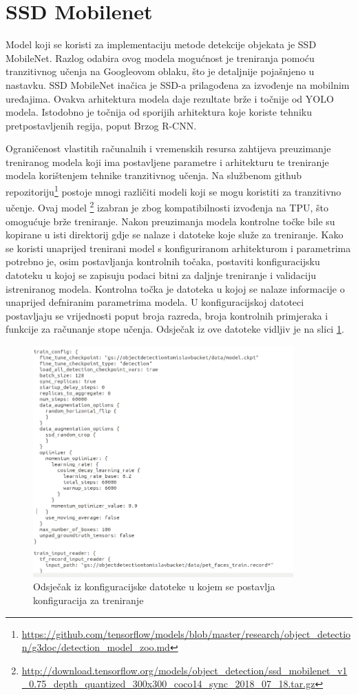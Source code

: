 \section{SSD Mobilenet}
Model koji se koristi za implementaciju metode detekcije objekata je SSD MobileNet.
Razlog odabira ovog modela mogućnost je treniranja pomoću tranzitivnog učenja na Googleovom oblaku, što je detaljnije pojašnjeno u nastavku.
SSD MobileNet inačica je SSD-a prilagođena za izvođenje na mobilnim uređajima.
Ovakva arhitektura modela daje rezultate brže i točnije od YOLO modela. Istodobno je točnija od 
sporijih arhitektura koje koriste tehniku pretpostavljenih regija, poput Brzog R-CNN. \citep{DBLP:journals/corr/LiuAESR15}

Ograničenost vlastitih računalnih i vremenskih resursa zahtijeva preuzimanje treniranog modela koji ima postavljene parametre i arhitekturu te treniranje modela korištenjem tehnike tranzitivnog učenja.
Na službenom github repozitoriju\footnote{\url{https://github.com/tensorflow/models/blob/master/research/object_detection/g3doc/detection_model_zoo.md}}
postoje mnogi različiti modeli koji se mogu koristiti za tranzitivno učenje. Ovaj model \footnote{\url{http://download.tensorflow.org/models/object_detection/ssd_mobilenet_v1_0.75_depth_quantized_300x300_coco14_sync_2018_07_18.tar.gz}}
izabran je zbog kompatibilnosti izvođenja na TPU, što omogućuje brže treniranje. Nakon preuzimanja modela kontrolne točke bile su kopirane u isti direktorij gdje se nalaze i datoteke koje služe za treniranje. 
Kako se koristi unaprijed trenirani model s konfiguriranom arhitekturom i parametrima potrebno je, osim postavljanja kontrolnih točaka, postaviti konfiguracijsku datoteku u kojoj se zapisuju podaci bitni za daljnje treniranje i
validaciju istreniranog modela. Kontrolna točka je datoteka u kojoj se nalaze informacije o unaprijed defniranim parametrima modela. U konfiguracijskoj datoteci postavljaju se vrijednosti poput broja razreda, broja kontrolnih primjeraka i funkcije za računanje stope učenja. 
Odsječak iz ove datoteke vidljiv je na slici \ref{Pipeline}.

\begin{figure}[htb]
    \centering
    \includegraphics[width=10cm]{img/pipeline.png}
    \caption{Odsječak iz konfiguracijske datoteke u kojem se postavlja konfiguracija za treniranje}
    \label{Pipeline}
\end{figure}



